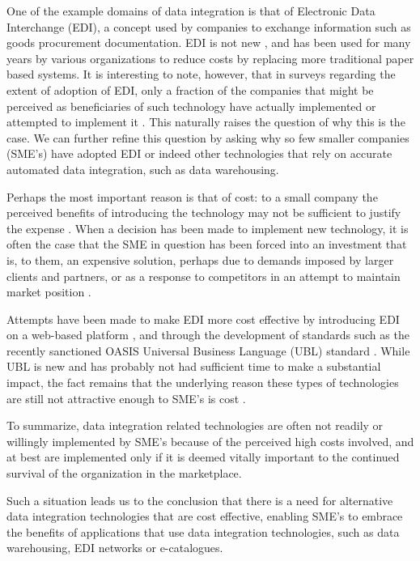 \documentclass{CRPITStyle}
\begin{document}
One of the example domains of data integration is that of Electronic
Data Interchange (EDI), a concept used by companies to exchange
information such as goods procurement documentation. EDI is not new
\cite{Beck-R-2002-Bled,Medj-B-2003-VLDB}, and has been used for many
years by various organizations to reduce costs by replacing more
traditional paper based systems. It is interesting to note, however,
that in surveys regarding the extent of adoption of EDI, only a fraction
of the companies that might be perceived as beneficiaries of such
technology have actually implemented or attempted to implement it
\cite{Beck-R-2002-Bled,vaHe-E-1999-EDI}. This naturally raises the
question of why this is the case. We can further refine this question by
asking why so few smaller companies (SME's) have adopted EDI or indeed
other technologies that rely on accurate automated data integration,
such as data warehousing.

Perhaps the most important reason is that of cost: to a small company
the perceived benefits of introducing the technology may not be
sufficient to justify the expense
\cite{Beck-R-2002-Bled,Guo-J-2003-DocEng,Somm-RA-2002-SIGMOD}. When a
decision has been made to implement new technology, it is often the case
that the SME in question has been forced into an investment that is, to
them, an expensive solution, perhaps due to demands imposed by larger
clients and partners, or as a response to competitors in an attempt to
maintain market position \cite{Beck-R-2002-Bled,vaHe-E-1999-EDI}.

Attempts have been made to make EDI more cost effective by introducing
EDI on a web-based platform \cite{Beck-R-2002-Bled}, and through the
development of standards such as the recently sanctioned OASIS Universal
Business Language (UBL) standard \cite{Mead-B-2004-UBL}. While UBL is
new and has probably not had sufficient time to make a substantial
impact, the fact remains that the underlying reason these types of
technologies are still not attractive enough to SME's is cost
\cite{Beck-R-2002-Bled,Guo-J-2003-DocEng,Somm-RA-2002-SIGMOD,vaHe-E-1999-EDI}.

To summarize, data integration related technologies are often not
readily or willingly implemented by SME's because of the perceived high
costs involved, and at best are implemented only if it is deemed vitally
important to the continued survival of the organization in the
marketplace.

Such a situation leads us to the conclusion that there is a need for
alternative data integration technologies that are cost effective,
enabling SME's to embrace the benefits of applications that use data
integration technologies, such as data warehousing, EDI networks or
e-catalogues.
\end{document}
